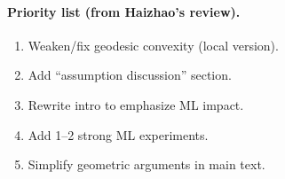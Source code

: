 \documentclass[twoside,11pt]{article}
\begin{document}
\paragraph{Priority list (from Haizhao's review).}
\begin{enumerate}
    \item Weaken/fix geodesic convexity (local version).
    \item Add ``assumption discussion'' section.
    \item Rewrite intro to emphasize ML impact.
    \item Add 1--2 strong ML experiments.
    \item Simplify geometric arguments in main text.
\end{enumerate}
\fi
\end{document}
